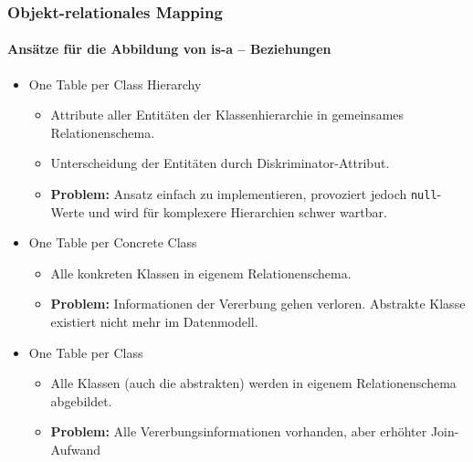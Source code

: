 \begin{frame}[t]\frametitle{Objekt-relationales Mapping}
\framesubtitle{Ansätze für die Abbildung von is-a -- Beziehungen}
\onslide
\begin{itemize}
	\item One Table per Class Hierarchy 
	\begin{itemize}
		\item Attribute aller Entit\"aten der Klassenhierarchie in gemeinsames Relationenschema. 
		\item Unterscheidung der Entit\"aten durch Diskriminator-Attribut.
		\item \textbf{Problem:} Ansatz einfach zu implementieren, provoziert jedoch \texttt{null}-Werte und wird f\"ur 
		komplexere Hierarchien schwer wartbar.\\[4pt]
	\end{itemize}
	\pause
	\item One Table per Concrete Class 
	\begin{itemize}
		\item Alle konkreten Klassen in eigenem Relationenschema.
		\item \textbf{Problem:} Informationen der Vererbung gehen verloren. Abstrakte Klasse existiert nicht mehr im Datenmodell.\\[4pt]
	\end{itemize}
	\pause
	\item One Table per Class
	\begin{itemize}
		\item Alle Klassen (auch die abstrakten) werden in eigenem Relationenschema abgebildet.
		\item \textbf{Problem:} Alle Vererbungsinformationen vorhanden, aber erhöhter Join-Aufwand 						
	\end{itemize}
\end{itemize}
\end{frame}

